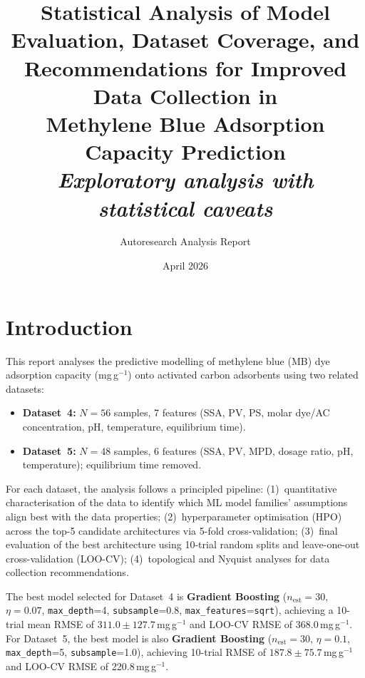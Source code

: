 \documentclass[12pt,a4paper]{article}
\title{%
  Statistical Analysis of Model Evaluation, Dataset Coverage, and \\
  Recommendations for Improved Data Collection in \\
  Methylene Blue Adsorption Capacity Prediction \\[6pt]
  \large\normalfont\textit{Exploratory analysis with statistical caveats}
}
\author{Autoresearch Analysis Report}
\date{April 2026}
\begin{document}
\maketitle
\tableofcontents
\newpage

\section{Introduction}
\label{sec:intro}

This report analyses the predictive modelling of methylene blue (MB) dye
adsorption capacity (mg\,g$^{-1}$) onto activated carbon adsorbents using
two related datasets:
\begin{itemize}[leftmargin=*]
  \item \textbf{Dataset~4:} $N=56$ samples, 7 features (SSA, PV, PS,
        molar dye/AC concentration, pH, temperature, equilibrium time).
  \item \textbf{Dataset~5:} $N=48$ samples, 6 features (SSA, PV, MPD,
        dosage ratio, pH, temperature); equilibrium time removed.
\end{itemize}

For each dataset, the analysis follows a principled pipeline:
(1)~quantitative characterisation of the data to identify which ML model
families' assumptions align best with the data properties;
(2)~hyperparameter optimisation (HPO) across the top-5 candidate
architectures via 5-fold cross-validation;
(3)~final evaluation of the best architecture using 10-trial random
splits and leave-one-out cross-validation (LOO-CV);
(4)~topological and Nyquist analyses for data collection recommendations.

The best model selected for Dataset~4 is \textbf{Gradient Boosting}
($n_{\text{est}}=30$, $\eta=0.07$, \texttt{max\_depth}=4,
\texttt{subsample}=0.8, \texttt{max\_features}=\texttt{sqrt}),
achieving a 10-trial mean RMSE of $311.0 \pm 127.7$\,mg\,g$^{-1}$ and
LOO-CV RMSE of 368.0\,mg\,g$^{-1}$.
For Dataset~5, the best model is also \textbf{Gradient Boosting}
($n_{\text{est}}=30$, $\eta=0.1$, \texttt{max\_depth}=5,
\texttt{subsample}=1.0), achieving 10-trial RMSE of
$187.8 \pm 75.7$\,mg\,g$^{-1}$ and LOO-CV RMSE of 220.8\,mg\,g$^{-1}$.
\end{document}
